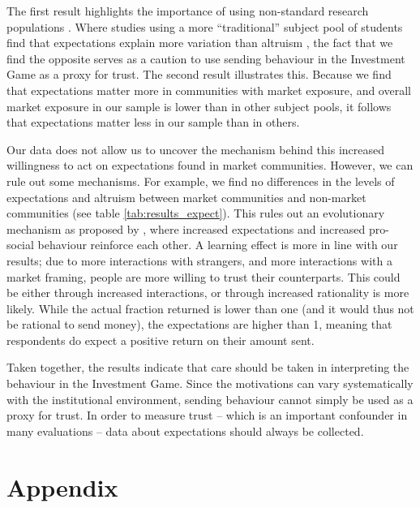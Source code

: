 The first result highlights the importance of using non-standard research populations \citep{Henrich2010a}. Where studies using a more ``traditional'' subject pool of students find that expectations explain more variation than altruism \citep[see e.g.][]{Ashraf2006}, the fact that we find the opposite serves as a caution to use sending behaviour in the Investment Game as a proxy for trust. The second result illustrates this. Because we find that expectations matter more in communities with market exposure, and overall market exposure in our sample is lower than in other subject pools, it follows that expectations matter less in our sample than in others.

Our data does not allow us to uncover the mechanism behind this increased willingness to act on expectations found in market communities. However, we can rule out some mechanisms. For example, we find no differences in the levels of expectations and altruism between market communities and non-market communities (see table \ref{tab:results_expect}). This rules out an evolutionary mechanism as proposed by \cite{Tabellini2008}, where increased expectations and increased pro-social behaviour reinforce each other. A learning effect is more in line with our results; due to more interactions with strangers, and more interactions with a market framing, people are more willing to trust their counterparts. This could be either through increased interactions, or through increased rationality \citep[e.g.][]{List2008,Cecchi2013} is more likely. While the actual fraction returned is lower than one (and it would thus not be rational to send money), the expectations are higher than 1, meaning that respondents do expect a positive return on their amount sent.

Taken together, the results indicate that care should be taken in interpreting the behaviour in the Investment Game. Since the motivations can vary systematically with the institutional environment, sending behaviour cannot simply be used as a proxy for trust. In order to measure trust -- which is an important confounder in many evaluations -- data about expectations should always be collected.


\clearpage 




\clearpage
\section{Appendix}
\setcounter{table}{0}
\renewcommand{\thetable}{A\arabic{table}}





